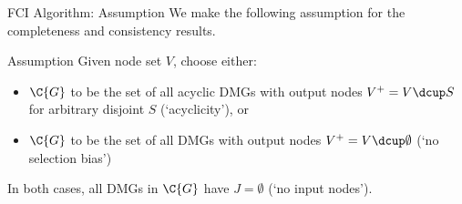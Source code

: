 \begin{frame}{FCI Algorithm: Assumption}
  We make the following assumption for the completeness and consistency results.

  \begin{block}{Assumption}
    Given node set $V$, choose either:
    \begin{itemize}
      \item $\C{G}$ to be the set of all acyclic DMGs with output nodes $V^+ = V \dcup S$ for arbitrary disjoint $S$ (`acyclicity'), or
      \item $\C{G}$ to be the set of all DMGs with output nodes $V^+ = V \dcup \emptyset$ (`no selection bias')
    \end{itemize}
    In both cases, all DMGs in $\C{G}$ have $J = \emptyset$ (`no input nodes').
  \end{block}
\end{frame}

